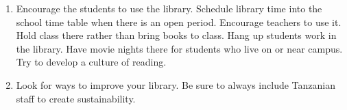 \begin{enumerate}
\item Encourage the students to use the library.  Schedule library time into the school time table when there is an open period.  Encourage teachers to use it.  Hold class there rather than bring books to class. Hang up students work in the library. Have movie nights there for students who live on or near campus. Try to develop a culture of reading.

\item Look for ways to improve your library.  Be sure to always include Tanzanian staff to create sustainability. 

\end{enumerate}
